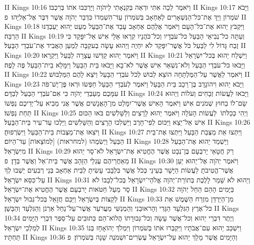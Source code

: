II Kings 10:16	וַיֹּאמֶר לְכָה אִתִּי וּרְאֵה בְּקִנְאָתִי לַיהֹוָה וַיַּרְכִּבוּ אֹתוֹ בְּרִכְבּוֹ׃
II Kings 10:17	וַיָּבֹא שֹׁמְרוֹן וַיַּךְ אֶת־כּל־הַנִּשְׁאָרִים לְאַחְאָב בְּשֹׁמְרוֹן עַד־הִשְׁמִדוֹ כִּדְבַר יְהֹוָה אֲשֶׁר דִּבֶּר אֶל־אֵלִיָּהוּ׃ {פ}
II Kings 10:18	וַיִּקְבֹּץ יֵהוּא אֶת־כּל־הָעָם וַיֹּאמֶר אֲלֵהֶם אַחְאָב עָבַד אֶת־הַבַּעַל מְעָט יֵהוּא יַעַבְדֶנּוּ הַרְבֵּה׃
II Kings 10:19	וְעַתָּה כל־נְבִיאֵי הַבַּעַל כּל־עֹבְדָיו וְכל־כֹּהֲנָיו קִרְאוּ אֵלַי אִישׁ אַל־יִפָּקֵד כִּי זֶבַח גָּדוֹל לִי לַבַּעַל כֹּל אֲשֶׁר־יִפָּקֵד לֹא יִחְיֶה וְיֵהוּא עָשָׂה בְעקְבָּה לְמַעַן הַאֲבִיד אֶת־עֹבְדֵי הַבָּעַל׃
II Kings 10:20	וַיֹּאמֶר יֵהוּא קַדְּשׁוּ עֲצָרָה לַבַּעַל וַיִּקְרָאוּ׃
II Kings 10:21	וַיִּשְׁלַח יֵהוּא בְּכל־יִשְׂרָאֵל וַיָּבֹאוּ כּל־עֹבְדֵי הַבַּעַל וְלֹא־נִשְׁאַר אִישׁ אֲשֶׁר לֹא־בָא וַיָּבֹאוּ בֵּית הַבַּעַל וַיִּמָּלֵא בֵית־הַבַּעַל פֶּה לָפֶה׃
II Kings 10:22	וַיֹּאמֶר לַאֲשֶׁר עַל־הַמֶּלְתָּחָה הוֹצֵא לְבוּשׁ לְכֹל עֹבְדֵי הַבָּעַל וַיֹּצֵא לָהֶם הַמַּלְבּוּשׁ׃
II Kings 10:23	וַיָּבֹא יֵהוּא וִיהוֹנָדָב בֶּן־רֵכָב בֵּית הַבָּעַל וַיֹּאמֶר לְעֹבְדֵי הַבַּעַל חַפְּשׂוּ וּרְאוּ פֶּן־יֶשׁ־פֹּה עִמָּכֶם מֵעַבְדֵי יְהֹוָה כִּי אִם־עֹבְדֵי הַבַּעַל לְבַדָּם׃
II Kings 10:24	וַיָּבֹאוּ לַעֲשׂוֹת זְבָחִים וְעֹלוֹת וְיֵהוּא שָׂם־לוֹ בַחוּץ שְׁמֹנִים אִישׁ וַיֹּאמֶר הָאִישׁ אֲשֶׁר־יִמָּלֵט מִן־הָאֲנָשִׁים אֲשֶׁר אֲנִי מֵבִיא עַל־יְדֵיכֶם נַפְשׁוֹ תַּחַת נַפְשׁוֹ׃
II Kings 10:25	וַיְהִי כְּכַלֹּתוֹ  לַעֲשׂוֹת הָעֹלָה וַיֹּאמֶר יֵהוּא לָרָצִים וְלַשָּׁלִשִׁים בֹּאוּ הַכּוּם אִישׁ אַל־יֵצֵא וַיַּכּוּם לְפִי־חָרֶב וַיַּשְׁלִכוּ הָרָצִים וְהַשָּׁלִשִׁים וַיֵּלְכוּ עַד־עִיר בֵּית־הַבָּעַל׃
II Kings 10:26	וַיֹּצִאוּ אֶת־מַצְּבוֹת בֵּית־הַבַּעַל וַיִּשְׂרְפוּהָ׃
II Kings 10:27	וַיִּתְּצוּ אֵת מַצְּבַת הַבָּעַל וַיִּתְּצוּ אֶת־בֵּית הַבַּעַל וַיְשִׂמֻהוּ (למחראות) [לְמוֹצָאוֹת] עַד־הַיּוֹם׃
II Kings 10:28	וַיַּשְׁמֵד יֵהוּא אֶת־הַבַּעַל מִיִּשְׂרָאֵל׃
II Kings 10:29	רַק חֲטָאֵי יָרבְעָם בֶּן־נְבָט אֲשֶׁר הֶחֱטִיא אֶת־יִשְׂרָאֵל לֹא־סָר יֵהוּא מֵאַחֲרֵיהֶם עֶגְלֵי הַזָּהָב אֲשֶׁר בֵּית־אֵל וַאֲשֶׁר בְּדָן׃ {פ}
II Kings 10:30	וַיֹּאמֶר יְהֹוָה אֶל־יֵהוּא יַעַן אֲשֶׁר־הֱטִיבֹתָ לַעֲשׂוֹת הַיָּשָׁר בְּעֵינַי כְּכֹל אֲשֶׁר בִּלְבָבִי עָשִׂיתָ לְבֵית אַחְאָב בְּנֵי רְבִעִים יֵשְׁבוּ לְךָ עַל־כִּסֵּא יִשְׂרָאֵל׃
II Kings 10:31	וְיֵהוּא לֹא שָׁמַר לָלֶכֶת בְּתוֹרַת־יְהֹוָה אֱלֹהֵי־יִשְׂרָאֵל בְּכל־לְבָבוֹ לֹא סָר מֵעַל חַטֹּאות יָרבְעָם אֲשֶׁר הֶחֱטִיא אֶת־יִשְׂרָאֵל׃
II Kings 10:32	בַּיָּמִים הָהֵם הֵחֵל יְהֹוָה לְקַצּוֹת בְּיִשְׂרָאֵל וַיַּכֵּם חֲזָאֵל בְּכל־גְּבוּל יִשְׂרָאֵל׃
II Kings 10:33	מִן־הַיַּרְדֵּן מִזְרַח הַשֶּׁמֶשׁ אֵת כּל־אֶרֶץ הַגִּלְעָד הַגָּדִי וְהָראוּבֵנִי וְהַמְנַשִּׁי מֵעֲרֹעֵר אֲשֶׁר־עַל־נַחַל אַרְנֹן וְהַגִּלְעָד וְהַבָּשָׁן׃
II Kings 10:34	וְיֶתֶר דִּבְרֵי יֵהוּא וְכל־אֲשֶׁר עָשָׂה וְכל־גְּבוּרָתוֹ הֲלוֹא־הֵם כְּתוּבִים עַל־סֵפֶר דִּבְרֵי הַיָּמִים לְמַלְכֵי יִשְׂרָאֵל׃
II Kings 10:35	וַיִּשְׁכַּב יֵהוּא עִם־אֲבֹתָיו וַיִּקְבְּרוּ אֹתוֹ בְּשֹׁמְרוֹן וַיִּמְלֹךְ יְהוֹאָחָז בְּנוֹ תַּחְתָּיו׃
II Kings 10:36	וְהַיָּמִים אֲשֶׁר מָלַךְ יֵהוּא עַל־יִשְׂרָאֵל עֶשְׂרִים־וּשְׁמֹנֶה שָׁנָה בְּשֹׁמְרוֹן׃ {פ}
